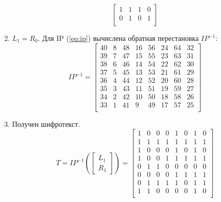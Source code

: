 \documentclass[a4paper, 14pt]{extarticle}
\begin{document}
\begin{enumerate}
\begin{equation}
\begin{bmatrix}
            1   & 1   & 1   & 0   \\
            0   & 1   & 0   & 1   \\
        \end{bmatrix}
    \end{equation}
    \item $L_1 = R_0$. Для IP (\ref{eq:ip}) вычислена обратная перестановка $IP^{-1}$:
    \begin{equation}
        IP^{-1} = \begin{bmatrix}
            40  & 8   & 48  & 16  & 56  & 24  & 64  & 32  \\
            39  & 7   & 47  & 15  & 55  & 23  & 63  & 31  \\
            38  & 6   & 46  & 14  & 54  & 22  & 62  & 30  \\
            37  & 5   & 45  & 13  & 53  & 21  & 61  & 29  \\
            36  & 4   & 44  & 12  & 52  & 20  & 60  & 28  \\
            35  & 3   & 43  & 11  & 51  & 19  & 59  & 27  \\
            34  & 2   & 42  & 10  & 50  & 18  & 58  & 26  \\
            33  & 1   & 41  & 9   & 49  & 17  & 57  & 25  \\
        \end{bmatrix}
    \end{equation}
    \item Получен шифротекст.
    \begin{equation}
        T = IP^{-1}\left( \begin{bmatrix}
            L_1\\
            R_1
        \end{bmatrix} \right) = \begin{bmatrix}
            1   & 0   & 0   & 0   & 1   & 0   & 1   & 0   \\
            1   & 1   & 1   & 1   & 1   & 1   & 1   & 1   \\
            1   & 0   & 0   & 0   & 1   & 0   & 1   & 0   \\
            1   & 0   & 0   & 1   & 1   & 1   & 1   & 1   \\
            0   & 1   & 1   & 0   & 0   & 0   & 0   & 0   \\
            0   & 0   & 0   & 0   & 1   & 1   & 1   & 1   \\
            0   & 1   & 1   & 1   & 1   & 0   & 1   & 1   \\
            1   & 1   & 0   & 0   & 0   & 0   & 1   & 0   \\

\end{bmatrix}
\end{equation}
\end{enumerate}
\end{document}
